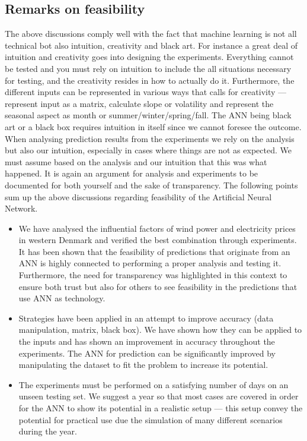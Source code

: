 \subsection{Remarks on feasibility}
The above discussions comply well with the fact that machine learning is not all technical bot also intuition, creativity and black art\cite{18}. For instance a great deal of intuition and creativity goes into designing the experiments. Everything cannot be tested and you must rely on intuition to include the all situations necessary for testing, and the creativity resides in how to actually do it. Furthermore, the different inputs can be represented in various ways that calls for creativity --- represent input as a matrix, calculate slope or volatility and represent the seasonal aspect as month or summer/winter/spring/fall. The ANN being black art or a black box requires intuition in itself since we cannot foresee the outcome. When analysing prediction results from the experiments we rely on the analysis but also our intuition, especially in cases where things are not as expected. We must assume based on the analysis and our intuition that this was what happened. It is again an argument for analysis and experiments to be documented for both yourself and the sake of transparency. The following points sum up the above discussions regarding feasibility of the Artificial Neural Network.

\begin{itemize}
\item We have analysed the influential factors of wind power and electricity prices in western Denmark and verified the best combination through experiments. It has been shown that the feasibility of predictions that originate from an ANN is highly connected to performing a proper analysis and testing it. Furthermore, the need for transparency was highlighted in this context to ensure both trust but also for others to see feasibility in the predictions that use ANN as technology.
\item Strategies have been applied in an attempt to improve accuracy (data manipulation, matrix, black box). We have shown how they can be applied to the inputs and has shown an improvement in accuracy throughout the experiments. The ANN for prediction can be significantly improved by manipulating the dataset to fit the problem to increase its potential.
\item The experiments must be performed on a satisfying number of days on an unseen testing set. We suggest a year so that most cases are covered in order for the ANN to show its potential in a realistic setup --- this setup convey the potential for practical use due the simulation of many different scenarios during the year. 
\end{itemize}